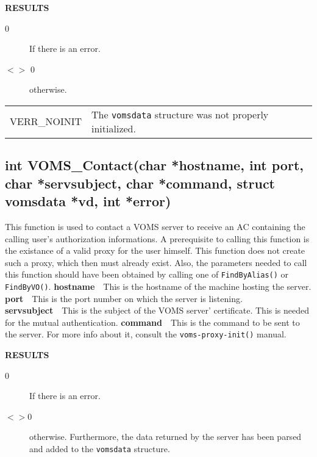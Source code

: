 \documentclass[a4paper]{book}
\newcommand{\result}{\noindent \textbf{RESULTS}\newline}
\newcommand{\parameter}[1]{\newline\textbf{#1}\ \ }
\begin{document}
\result
\begin{description}
\item[0] If there is an error.
\item[$<>$ 0] otherwise.
\end{description}

\bigskip\begin{tabular}{lp{3in}}
VERR\_NOINIT & The \verb|vomsdata| structure was not properly
initialized.\\
\end{tabular}


\subsection{int VOMS\_Contact(char *hostname, int port, char
  *servsubject, char *command, struct vomsdata *vd, int *error)}

This function is used to contact a VOMS server to receive an AC
containing the calling user's authorization informations.  A
prerequisite to calling this function is the existance of a valid
proxy for the user himself.  This function does not create such a
proxy, which then must already exist.  Also, the parameters needed to
call this function should have been obtained by calling one of
\verb|FindByAlias()| or \verb|FindByVO()|.
\parameter{hostname}{This is the hostname of the machine hosting the
  server.}
\parameter{port}{This is the port number on which the server is
  listening.}
\parameter{servsubject}{This is the subject of the VOMS server'
  certificate.  This is needed for the mutual authentication.}
\parameter{command}{This is the command to be sent to the server.  For
  more info about it, consult the \verb|voms-proxy-init()| manual.}

\result
\begin{description}
\item[0] If there is an error.
\item[$<>$0] otherwise.  Furthermore, the data returned by the server
  has been parsed and added to the \verb|vomsdata| structure.
\end{description}
\end{document}
